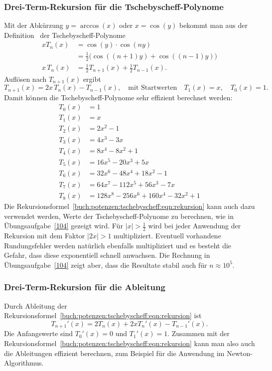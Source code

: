\subsubsection{Drei-Term-Rekursion für die Tschebyscheff-Polynome}
Mit der Abkürzung $y=\arccos(x)$ oder $x=\cos(y)$ bekommt man aus
der Definition~\label{buch:potenzen:def:tschebyscheff}
der Tschebyscheff-Polynome
\begin{align*}
xT_n(x)
&=
\cos(y)\cdot \cos(ny)
\\
&=
\frac12\bigl(
\cos((n+1)y) + \cos((n-1)y)
\bigr)
\\
x\,T_n(x)
&=
\frac12 T_{n+1}(x) + \frac12 T_{n-1}(x).
\end{align*}
Auflösen nach $T_{n+1}(x)$ ergibt
\begin{equation}
T_{n+1}(x) = 2x\,T_n(x)-T_{n-1}(x),
\quad
\text{mit Startwerten}
\quad T_1(x)=x,
\quad
T_0(x)=1.
\label{buch:potenzen:tschebyscheff:eqn:rekursion}
\end{equation}
Damit können die Tschebyscheff-Polynome sehr effizient berechnet werden:
\begin{equation}
\label{eq:tschebyscheff-polynome}
\begin{aligned}
T_0(x)
&=1
\\
T_1(x)
&=
x
\\
T_2(x)
&=
2x^2-1
\\
T_3(x)
&=
4x^3-3x
\\
T_4(x)
&=
8x^4-8x^2+1
\\
T_5(x)
&=
16x^5-20x^3+5x
\\
T_6(x)
&=
32x^6-48x^4+18x^2-1
\\
T_7(x)
&=
64x^7-112x^5+56x^3-7x
\\
T_8(x)
&=
128x^8-256x^6+160x^4-32x^2+1
\end{aligned}
\end{equation}
Die Rekursionsformel~\eqref{buch:potenzen:tschebyscheff:eqn:rekursion}
kann auch dazu verwendet werden, Werte der Tschebyscheff-Polynome
zu berechnen, wie in Übungsaufgabe~\ref{104} gezeigt wird.
Für $|x|>\frac12$ wird bei jeder Anwendung der Rekursion mit dem
Faktor $|2x|>1$ multipliziert.
Eventuell vorhandene Rundungsfehler werden natürlich ebenfalls
multipliziert und es besteht die Gefahr, dass diese exponentiell
schnell anwachsen.
Die Rechnung in Übungsaufgabe~\ref{104} zeigt aber, dass die
Resultate stabil auch für $n \approx 10^5$.

%
%
\subsubsection{Drei-Term-Rekursion für die Ableitung}
Durch Ableitung der 
Rekursionsformel~\eqref{buch:potenzen:tschebyscheff:eqn:rekursion}
ist
\[
T_{n+1}'(x)
=
2T_{n}(x) + 2xT_n'(x) - T_{n-1}'(x).
\]
Die Anfangswerte sind $T_0'(x)=0$ und $T_1'(x)=1$.
Zusammen mit der
Rekursionsformel~\eqref{buch:potenzen:tschebyscheff:eqn:rekursion}
kann man also auch die Ableitungen effizient berechnen, zum Beispiel
für die Anwendung im Newton-Algorithmus.

